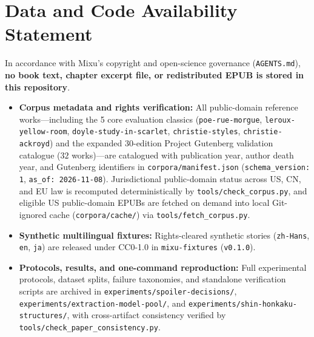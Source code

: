 \documentclass[11pt,twocolumn]{article}
\begin{document}
\section{Data and Code Availability Statement}
\label{sec:availability}

In accordance with Mixu's copyright and open-science governance (\texttt{AGENTS.md}), \textbf{no book text, chapter excerpt file, or redistributed EPUB is stored in this repository}.
\begin{itemize}
  \item \textbf{Corpus metadata and rights verification:} All public-domain reference works—including the 5 core evaluation classics (\texttt{poe-rue-morgue}, \texttt{leroux-yellow-room}, \texttt{doyle-study-in-scarlet}, \texttt{christie-styles}, \texttt{christie-ackroyd}) and the expanded 30-edition Project Gutenberg validation catalogue ($32$ works)—are catalogued with publication year, author death year, and Gutenberg identifiers in \texttt{corpora/manifest.json} (\texttt{schema\_version: 1}, \texttt{as\_of: 2026-11-08}). Jurisdictional public-domain status across US, CN, and EU law is recomputed deterministically by \texttt{tools/check\_corpus.py}, and eligible US public-domain EPUBs are fetched on demand into local Git-ignored cache (\texttt{corpora/cache/}) via \texttt{tools/fetch\_corpus.py}.
  \item \textbf{Synthetic multilingual fixtures:} Rights-cleared synthetic stories (\texttt{zh-Hans}, \texttt{en}, \texttt{ja}) are released under CC0-1.0 in \texttt{mixu-fixtures} (\texttt{v0.1.0}).
  \item \textbf{Protocols, results, and one-command reproduction:} Full experimental protocols, dataset splits, failure taxonomies, and standalone verification scripts are archived in \texttt{experiments/spoiler-decisions/}, \texttt{experiments/extraction-model-pool/}, and \texttt{experiments/shin-honkaku-structures/}, with cross-artifact consistency verified by \texttt{tools/check\_paper\_consistency.py}.
\end{itemize}



\end{document}

